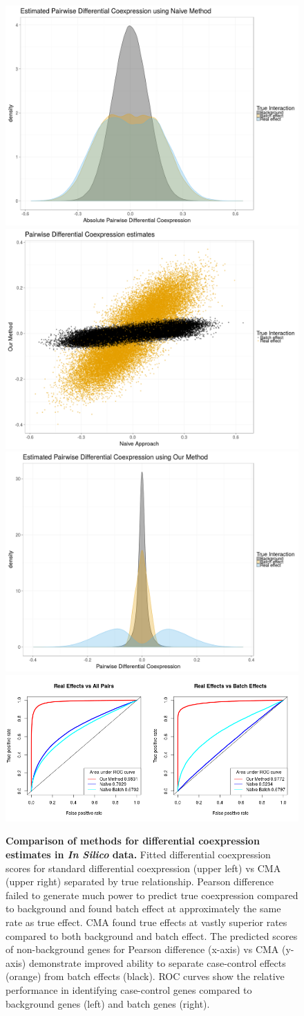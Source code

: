\begin{figure}
\begin{center}
\includegraphics[width=.45\columnwidth]{figures/NaiveDensity.png}
\includegraphics[width=.45\columnwidth]{figures/OursVsNaive.png}
\\
\includegraphics[width=.45\columnwidth]{figures/ourMethodDensity.png}
\includegraphics[width=.45\columnwidth]{figures/OursVsOthersROC.png}
\end{center}\caption[Comparison of methods for differential coexpression estimates]{\textbf{Comparison of methods for differential coexpression estimates in \emph{In Silico} data.} Fitted differential coexpression scores
for standard differential coexpression (upper left) vs CMA
(upper right) separated by true relationship. Pearson difference failed
to generate much power to predict true coexpression compared to background
and found batch effect at approximately the same rate as true effect.
CMA found true effects at vastly superior rates compared to
both background and batch effect. The predicted scores of non-background
genes for Pearson difference (x-axis) vs CMA (y-axis) demonstrate
improved ability to separate case-control effects (orange) from batch
effects (black). ROC curves show the relative performance in identifying
case-control genes compared to background genes (left) and batch genes
(right).}
\label{fig:insilico_results}
\end{figure}


